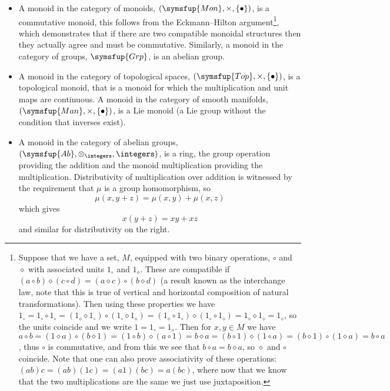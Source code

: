 \documentclass[fleqn]{NotesClass}
\makeatletter
\newcommand{\c@egory}[1]{\symsfup{#1}}
\newcommand{\Grp}{\c@egory{Grp}}
\newcommand{\Ab}{\c@egory{Ab}}
\newcommand{\Top}{\c@egory{Top}}
\newcommand{\Man}{\c@egory{Man}}
\newcommand{\Mon}{\c@egory{Mon}}
\makeatother
\begin{document}
\begin{exm}{}{}
\begin{itemize}
            \item A monoid in the category of monoids, \((\Mon, \times, \{\bullet\})\), is a commutative monoid, this follows from the Eckmann--Hilton argument\footnote{Suppose that we have a set, \(M\), equipped with two binary operations, \(\circ\) and \(\diamond\) with associated units \(1_\circ\) and \(1_\diamond\). These are compatible if \((a \circ b) \diamond (c \circ d) = (a \diamond c) \circ (b \diamond d)\) (a result known as the interchange law, note that this is true of vertical and horizontal composition of natural transformations). Then using these properties we have \(1_\circ = 1_{\circ} \circ 1_{\circ} = (1_\diamond \diamond 1_\circ) \circ (1_\circ \diamond 1_\diamond) = (1_\diamond \circ 1_\circ) \diamond (1_\circ \circ 1_\diamond) = 1_\diamond \diamond 1_\diamond = 1_\diamond\), so the units coincide and we write \(1 = 1_\circ = 1_\diamond\). Then for \(x, y \in M\) we have \(a \circ b = (1 \diamond a) \circ (b \diamond 1) = (1 \circ b) \diamond (a \circ 1) = b \diamond a = (b \circ 1) \diamond (1 \circ a) = (b \diamond 1) \circ (1 \diamond a) = b \circ a\), thus \(\circ\) is commutative, and from this we see that \(b \circ a = b \diamond a\), so \(\diamond\) and \(\circ\) coincide. Note that one can also prove associativity of these operations: \((ab)c = (ab)(1c) = (a1)(bc) = a(bc)\), where now that we know that the two multiplications are the same we just use juxtaposition.}, which demonstrates that if there are two compatible monoidal structures then they actually agree and must be commutative.
            Similarly, a monoid in the category of groups, \(\Grp\), is an abelian group.
            
            \item A monoid in the category of topological spaces, \((\Top, \times, \{\bullet\})\), is a topological monoid, that is a monoid for which the multiplication and unit maps are continuous.
            A monoid in the category of smooth manifolds, \((\Man, \times, \{\bullet\})\), is a Lie monoid (a Lie group without the condition that inverses exist).
            
            \item A monoid in the category of abelian groups, \((\Ab, \otimes_{\integers}, \integers)\), is a ring, the group operation providing the addition and the monoid multiplication providing the multiplication.
            Distributivity of multiplication over addition is witnessed by the requirement that \(\mu\) is a group homomorphism, so
            \begin{equation}
                \mu(x, y + z) = \mu(x, y) + \mu(x, z)
            \end{equation}
            which gives
            \begin{equation}
                x(y + z) = xy + xz
            \end{equation}
            and similar for distributivity on the right.
            

\end{itemize}
\end{exm}
\end{document}

